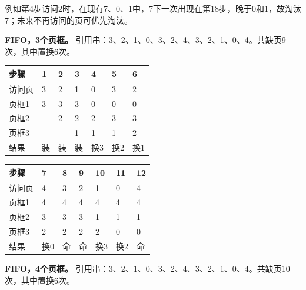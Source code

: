 例如第4步访问2时，在现有7、0、1中，7下一次出现在第18步，晚于0和1，故淘汰7；未来不再访问的页可优先淘汰。

\textbf{FIFO，3个页框。} 引用串：3、2、1、0、3、2、4、3、2、1、0、4。共缺页9次，其中置换6次。

\begin{wideblock}\par\medskip\noindent\begin{minipage}{\linewidth}\fontsize{9.3}{12}\selectfont\begin{tabularx}{\linewidth}{@{}YYYYYYY@{}}
\toprule\noalign{}
步骤 & 1 & 2 & 3 & 4 & 5 & 6 \\
\midrule\noalign{}


访问页 & 3 & 2 & 1 & 0 & 3 & 2 \\
页框1 & 3 & 3 & 3 & 0 & 0 & 0 \\
页框2 & --- & 2 & 2 & 2 & 3 & 3 \\
页框3 & --- & --- & 1 & 1 & 1 & 2 \\
结果 & 装 & 装 & 装 & 换3 & 换2 & 换1 \\
\bottomrule\end{tabularx}
\end{minipage}\par\medskip\end{wideblock}

\begin{wideblock}\par\medskip\noindent\begin{minipage}{\linewidth}\fontsize{9.3}{12}\selectfont\begin{tabularx}{\linewidth}{@{}YYYYYYY@{}}
\toprule\noalign{}
步骤 & 7 & 8 & 9 & 10 & 11 & 12 \\
\midrule\noalign{}


访问页 & 4 & 3 & 2 & 1 & 0 & 4 \\
页框1 & 4 & 4 & 4 & 4 & 4 & 4 \\
页框2 & 3 & 3 & 3 & 1 & 1 & 1 \\
页框3 & 2 & 2 & 2 & 2 & 0 & 0 \\
结果 & 换0 & 命 & 命 & 换3 & 换2 & 命 \\
\bottomrule\end{tabularx}
\end{minipage}\par\medskip\end{wideblock}

\textbf{FIFO，4个页框。} 引用串：3、2、1、0、3、2、4、3、2、1、0、4。共缺页10次，其中置换6次。

